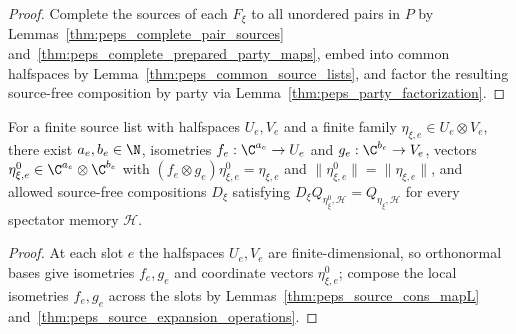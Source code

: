 \begin{proof}\leanok
    Complete the sources of each $F_\xi$ to all unordered pairs in $P$ by
    Lemmas~\ref{thm:peps_complete_pair_sources}
    and~\ref{thm:peps_complete_prepared_party_maps}, embed into common
    halfspaces by Lemma~\ref{thm:peps_common_source_lists}, and factor the
    resulting source-free composition by party via
    Lemma~\ref{thm:peps_party_factorization}.
\end{proof}



\begin{lemma}
    \label{thm:peps_finite_source_coordinates}
    \leanok
    For a finite source list with halfspaces $U_e,V_e$ and a finite family
    $\eta_{\xi,e}\in U_e\otimes V_e$, there exist $a_e,b_e\in\N$, isometries
    $f_e:\C^{a_e}\to U_e$ and $g_e:\C^{b_e}\to V_e$, vectors
    $\eta^0_{\xi,e}\in\C^{a_e}\otimes\C^{b_e}$ with
    $(f_e\otimes g_e)\eta^0_{\xi,e}=\eta_{\xi,e}$ and
    $\|\eta^0_{\xi,e}\|=\|\eta_{\xi,e}\|$, and allowed source-free compositions
    $D_\xi$ satisfying $D_\xi Q_{\eta^0_\xi,\mathcal H}=Q_{\eta_\xi,\mathcal H}$
    for every spectator memory $\mathcal H$.
\end{lemma}

\begin{proof}\leanok
    At each slot $e$ the halfspaces $U_e,V_e$ are finite-dimensional, so
    orthonormal bases give isometries $f_e,g_e$ and coordinate vectors
    $\eta^0_{\xi,e}$; compose the local isometries $f_e,g_e$ across the slots by
    Lemmas~\ref{thm:peps_source_cons_mapL}
    and~\ref{thm:peps_source_expansion_operations}.
\end{proof}

